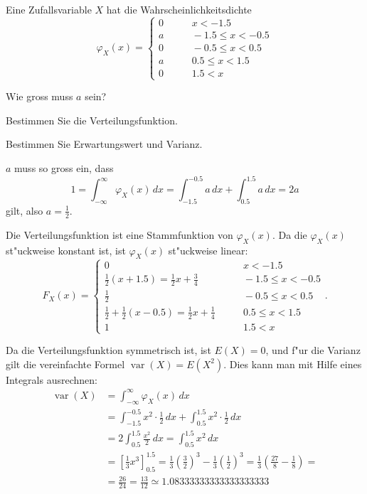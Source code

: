 Eine Zufallsvariable $X$ hat die Wahrscheinlichkeitsdichte
\[
\varphi_X(x)=\begin{cases}
0&\qquad x <-1.5\\
a&\qquad -1.5\le x<-0.5\\
0&\qquad -0.5\le x<0.5\\
a&\qquad 0.5\le x<1.5\\
0&\qquad 1.5<x
\end{cases}
\]
\begin{teilaufgaben}
\item Wie gross muss $a$ sein?
\item Bestimmen Sie die Verteilungsfunktion.
\item Bestimmen Sie Erwartungswert und Varianz.
\end{teilaufgaben}

\begin{loesung}
\begin{teilaufgaben}
\item $a$ muss so gross ein, dass
\[
1=\int_{-\infty}^\infty \varphi_X(x)\,dx=
\int_{-1.5}^{-0.5}a\,dx+\int_{0.5}^{1.5}a\,dx=2a
\]
gilt, also $a=\frac12$.
\item Die Verteilungsfunktion ist eine Stammfunktion von $\varphi_X(x)$.
Da die $\varphi_X(x)$ st"uckweise konstant ist, ist $\varphi_X(x)$
st"uckweise linear:
\[
F_X(x)=\begin{cases}
0&\qquad x <-1.5\\
\frac12(x+1.5)=\frac12x+\frac34&\qquad -1.5\le x<-0.5\\
\frac12&\qquad -0.5\le x<0.5\\
\frac12+\frac12(x-0.5)=\frac12x+\frac14&\qquad 0.5\le x<1.5\\
1&\qquad 1.5<x
\end{cases}.
\]
\item Da die Verteilungsfunktion symmetrisch ist, ist $E(X)=0$, und
f"ur die Varianz gilt die vereinfachte Formel $\operatorname{var}(X)=E(X^2)$.
Dies kann man mit Hilfe eines Integrals ausrechnen:
\begin{align*}
\operatorname{var}(X)
&=\int_{-\infty}^\infty \varphi_X(x)\,dx\\
&=\int_{-1.5}^{-0.5}x^2\cdot\frac12\,dx+\int_{0.5}^{1.5} x^2\cdot \frac12\,dx\\
&=2\int_{0.5}^{1.5}\frac{x^2}2\,dx=\int_{0.5}^{1.5}x^2\,dx\\
&=\left[\frac13x^3\right]_{0.5}^{1.5}
 =\frac13\left(\frac32\right)^3-\frac13\left(\frac12\right)^3
=\frac13\left(\frac{27}8-\frac18\right)=
\\
&=\frac{26}{24}=\frac{13}{12}
\simeq 1.08333333333333333333
\end{align*}

\end{teilaufgaben}
\end{loesung}

